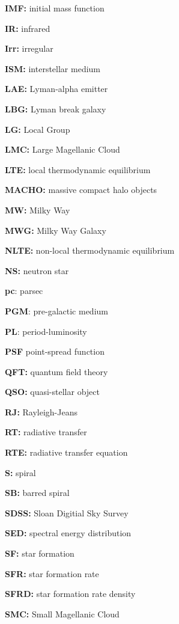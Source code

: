 \documentclass[a4paper,11pt]{article}
\begin{document}
{\noindent}\textbf{IMF:} initial mass function

{\noindent}\textbf{IR:} infrared

{\noindent}\textbf{Irr:} irregular

{\noindent}\textbf{ISM:} interstellar medium

{\noindent}\textbf{LAE:} Lyman-alpha emitter

{\noindent}\textbf{LBG:} Lyman break galaxy

{\noindent}\textbf{LG:} Local Group

{\noindent}\textbf{LMC:} Large Magellanic Cloud

{\noindent}\textbf{LTE:} local thermodynamic equilibrium

{\noindent}\textbf{MACHO:} massive compact halo objects

{\noindent}\textbf{MW:} Milky Way

{\noindent}\textbf{MWG:} Milky Way Galaxy

{\noindent}\textbf{NLTE:} non-local thermodynamic equilibrium

{\noindent}\textbf{NS:} neutron star

{\noindent}\textbf{pc}: parsec

{\noindent}\textbf{PGM}: pre-galactic medium

{\noindent}\textbf{PL}: period-luminosity

{\noindent}\textbf{PSF} point-spread function

{\noindent}\textbf{QFT:} quantum field theory

{\noindent}\textbf{QSO:} quasi-stellar object

{\noindent}\textbf{RJ:} Rayleigh-Jeans

{\noindent}\textbf{RT:} radiative transfer

{\noindent}\textbf{RTE:} radiative transfer equation

{\noindent}\textbf{S:} spiral

{\noindent}\textbf{SB:} barred spiral

{\noindent}\textbf{SDSS:} Sloan Digitial Sky Survey

{\noindent}\textbf{SED:} spectral energy distribution

{\noindent}\textbf{SF:} star formation

{\noindent}\textbf{SFR:} star formation rate

{\noindent}\textbf{SFRD:} star formation rate density

{\noindent}\textbf{SMC:} Small Magellanic Cloud
\end{document}
